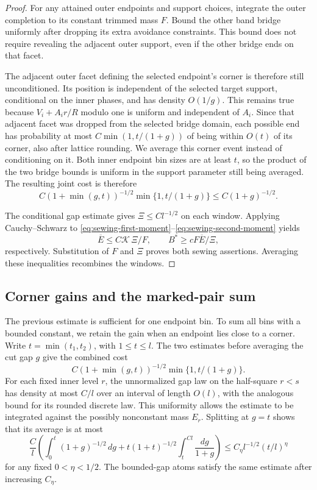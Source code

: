 \begin{proof}
For any attained outer endpoints and support choices, integrate the outer completion to its constant trimmed mass \(F\). Bound the other band bridge uniformly after dropping its extra avoidance constraints. This bound does not require revealing the adjacent outer support, even if the other bridge ends on that facet.

The adjacent outer facet defining the selected endpoint's corner is therefore still unconditioned. Its position is independent of the selected target support, conditional on the inner phases, and has density \(O(1/g)\). This remains true because \(V_i+A_i r/R\) modulo one is uniform and independent of \(A_i\). Since that adjacent facet was dropped from the selected bridge domain, each possible end has probability at most \(C\min(1,t/(1+g))\) of being within \(O(t)\) of its corner, also after lattice rounding. We average this corner event instead of conditioning on it. Both inner endpoint bin sizes are at least \(t\), so the product of the two bridge bounds is uniform in the support parameter still being averaged. The resulting joint cost is therefore
\[
 C(1+\min(g,t))^{-1/2}\min\{1,t/(1+g)\}
 \le C(1+g)^{-1/2}.
\]

The conditional gap estimate gives \(\Xi\le Cl^{-1/2}\) on each window. Applying Cauchy--Schwarz to \eqref{eq:sewing-first-moment}--\eqref{eq:sewing-second-moment} yields
\[
 \overline E\le C\mathcal K\,\Xi/F,
 \qquad B^*\ge cF\overline E/\Xi,
\]
respectively. Substitution of \(F\) and \(\Xi\) proves both sewing assertions. Averaging these inequalities recombines the windows.
\end{proof}

\subsection{Corner gains and the marked-pair sum}\label{sec:corner-sum}

The previous estimate is sufficient for one endpoint bin. To sum all bins with a bounded constant, we retain the gain when an endpoint lies close to a corner. Write $t=\min(t_1,t_2)$, with $1\le t\le l$. The two estimates before averaging the cut gap $g$ give the combined cost
\[
 C(1+\min(g,t))^{-1/2}\min\{1,t/(1+g)\}.
\]
For each fixed inner level $r$, the unnormalized gap law on the half-square $r<s$ has density at most $C/l$ over an interval of length $O(l)$, with the analogous bound for its rounded discrete law. This uniformity allows the estimate to be integrated against the possibly nonconstant mass $E_r$. Splitting at $g=t$ shows that its average is at most
\[
 \frac C l\left(\int_0^t(1+g)^{-1/2}\,dg
 +t(1+t)^{-1/2}\int_t^{Cl}\frac{dg}{1+g}\right)
 \le C_\eta l^{-1/2}(t/l)^\eta
\]
for any fixed $0<\eta<1/2$. The bounded-gap atoms satisfy the same estimate after increasing $C_\eta$.

